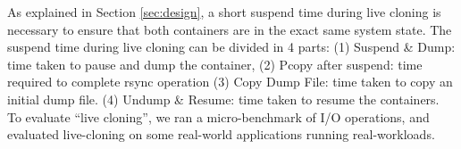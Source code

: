 As explained in Section \ref{sec:design}, a short suspend time during live cloning is necessary to ensure that both containers are in the exact same system state.
The suspend time during live cloning can be divided in 4 parts: 
(1) Suspend \& Dump: time taken to pause and dump the container, 
(2) Pcopy after suspend: time required to complete rsync operation 
(3) Copy Dump File: time taken to copy an initial dump file.
(4) Undump \& Resume: time taken to resume the containers. 
To evaluate ``live cloning'', we ran a micro-benchmark of I/O operations, and evaluated live-cloning on some real-world applications running real-workloads.






%
